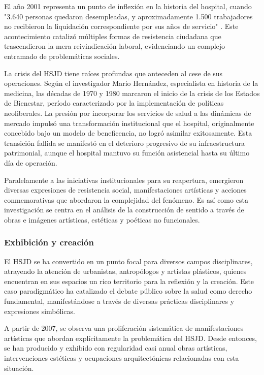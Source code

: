 El año 2001 representa un punto de inflexión en la historia del hospital, cuando "3.640 personas quedaron desempleadas, y aproximadamente 1.500 trabajadores no recibieron la liquidación correspondiente por sus años de servicio" \parencite{Castiblanco2017}. Este acontecimiento catalizó múltiples formas de resistencia ciudadana que trascendieron la mera reivindicación laboral, evidenciando un complejo entramado de problemáticas sociales.

La crisis del HSJD tiene raíces profundas que anteceden al cese de sus operaciones. Según el investigador Mario Hernández, especialista en historia de la medicina, las décadas de 1970 y 1980 marcaron el inicio de la crisis de los Estados de Bienestar, período caracterizado por la implementación de políticas neoliberales. La presión por incorporar los servicios de salud a las dinámicas de mercado impulsó una transformación institucional que el hospital, originalmente concebido bajo un modelo de beneficencia, no logró asimilar exitosamente. Esta transición fallida se manifestó en el deterioro progresivo de su infraestructura patrimonial, aunque el hospital mantuvo su función asistencial hasta su último día de operación.

Paralelamente a las iniciativas institucionales para su reapertura, emergieron diversas expresiones de resistencia social, manifestaciones artísticas y acciones conmemorativas que abordaron la complejidad del fenómeno. \textcolor{edit30sept}{Es así como} esta investigación se centra en el análisis de la construcción de sentido a través de obras e imágenes artísticas, estéticas y poéticas no funcionales.

\subsubsection*{Exhibición y creación}

El HSJD se ha convertido en un punto focal para diversos campos disciplinares, atrayendo la atención de urbanistas, antropólogos y artistas plásticos, quienes encuentran en sus espacios un rico territorio para la reflexión y la creación. Este caso paradigmático ha catalizado el debate público sobre la salud como derecho fundamental, manifestándose a través de diversas prácticas disciplinares y expresiones simbólicas.

A partir de 2007, se observa una proliferación sistemática de manifestaciones artísticas que abordan explícitamente la problemática del HSJD. Desde entonces, se han producido y exhibido con regularidad casi anual obras artísticas, intervenciones estéticas y ocupaciones arquitectónicas relacionadas con esta situación.

